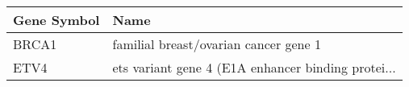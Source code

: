 \begin{tabular}{ll}
\toprule
Gene Symbol &                                               Name \\
\midrule
      BRCA1 &              familial breast/ovarian cancer gene 1 \\
       ETV4 & ets variant gene 4 (E1A enhancer binding protei... \\
\bottomrule
\end{tabular}
